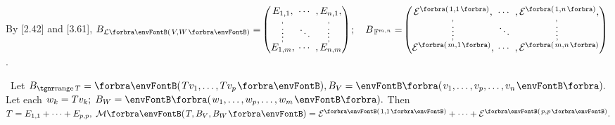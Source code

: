 By [2.42] and [3.61], \;$B_{\Lm[\SmallPar]{V,W}}=${\normalsize${\begin{pmatrix} \underset{\;,}{E_{1,1}}, &\hspace{-6pt} \cdots &\hspace{-6pt} ,\underset{\!,}{E_{n,1}},\\[-2pt] \vdots &\hspace{-6pt} \ddots &\hspace{-6pt} \vdots\\[-2pt] \overset{\;,}{E_{1,m}}, &\hspace{-6pt} \cdots &\hspace{-6pt} ,\overset{\!\!\!,}{E_{n,m}}\end{pmatrix}}$}$;\quad B_{\,{\mathbb{F}}^{m,n}}=${\normalsize$\envFontSmall[\scriptsize]{\begin{pmatrix} \underset{\;,}{\mathcal{E}^{\Par{1,1}}}, &\hspace{-6pt} \cdots &\hspace{-6pt} ,\underset{\!\!,}{\mathcal{E}^{\Par{1,n}}},\\[-2pt] \vdots &\hspace{-6pt} \ddots &\hspace{-6pt} \vdots\\[-2pt]\overset{\;,}{\mathcal{E}^{\Par{m,1}}}, &\hspace{-6pt} \cdots &\hspace{-6pt} ,\overset{\!\!\!,}{\mathcal{E}^{\Par{m,n}}}\end{pmatrix}}$}.\par\vspace{6pt}
\BulletPointX\Tips \,\,\,Let $B_{\range T}=\Par{Tv_1,\dots,Tv_p},B_V=\BigPar{v_1,\dots,v_p,\dots,v_n}.$ Let each $w_k=Tv_k;\;B_W=\BigPar{w_1,\dots,w_p,\dots,w_m}.$\TextB{\vspace{2pt}}\IndentTips{}
Then $T=E_{1,1}+\dots+E_{p,p},\;\Mt{T,B_V,B_W}=\mathcal{E}^{\SmallPar[1pt]{1,1}}+\dots+\mathcal{E}^{\SmallPar[1pt]{p,p}}.$\vspace{-4pt}
\SepLine

\pagebreak

